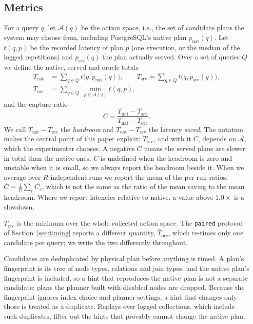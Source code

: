 \documentclass[conference]{IEEEtran}
\begin{document}
\subsection{Metrics}

For a query $q$, let $\mathcal{A}(q)$ be the action space, i.e., the set of
candidate plans the system may choose from, including PostgreSQL's native plan
$p_{\mathrm{nat}}(q)$. Let $t(q,p)$ be the recorded latency of plan $p$ (one
execution, or the median of the logged repetitions) and $p_{\mathrm{srv}}(q)$
the plan actually served. Over a set of queries $Q$ we define the native, served
and oracle totals
\begin{align}
T_{\mathrm{nat}} &= \textstyle\sum_{q\in Q} t\bigl(q, p_{\mathrm{nat}}(q)\bigr),
\qquad
T_{\mathrm{srv}} = \textstyle\sum_{q\in Q} t\bigl(q, p_{\mathrm{srv}}(q)\bigr),
\nonumber\\
T_{\mathrm{orc}} &= \textstyle\sum_{q\in Q}\ \min_{p\in\mathcal{A}(q)} t(q,p),
\end{align}
and the capture ratio
\begin{equation}
C = \frac{T_{\mathrm{nat}} - T_{\mathrm{srv}}}{T_{\mathrm{nat}} - T_{\mathrm{orc}}}.
\label{eq:capture}
\end{equation}
We call $T_{\mathrm{nat}} - T_{\mathrm{orc}}$ the \emph{headroom} and
$T_{\mathrm{nat}} - T_{\mathrm{srv}}$ the latency \emph{saved}. The notation
makes the central point of this paper explicit: $T_{\mathrm{orc}}$, and with it
$C$, depends on $\mathcal{A}$, which the experimenter chooses. A negative $C$
means the served plans are slower in total than the native ones. $C$ is
undefined when the headroom is zero and unstable when it is small, so we always
report the headroom beside it. When we average over $R$ independent runs we
report the mean of the per-run ratios, $\overline{C} = \frac{1}{R}\sum_r C_r$,
which is not the same as the ratio of the mean saving to the mean headroom.
Where we report latencies relative to native, a value above $1.0\times$ is a
slowdown.

$T_{\mathrm{orc}}$ is the minimum over the whole collected action space. The
\texttt{paired} protocol of Section~\ref{sec:timing} reports a different
quantity, $\widehat{T}_{\mathrm{orc}}$, which re-times only one candidate per
query; we write the two differently throughout.

Candidates are deduplicated by physical plan before anything is timed. A plan's
fingerprint is its tree of node types, relations and join types, and the native
plan's fingerprint is included, so a hint that reproduces the native plan is
not a separate candidate; plans the planner built with disabled nodes are
dropped. Because the fingerprint ignores index choice and planner settings, a
hint that changes only those is treated as a duplicate. Replays over logged
collections, which include such duplicates, filter out the hints that provably
cannot change the native plan.
\end{document}
